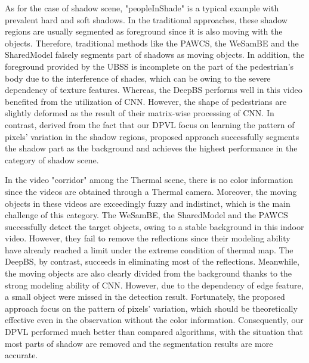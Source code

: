 \documentclass[journal]{IEEEtran}
\begin{document}
As for the case of shadow scene, "peopleInShade" is a typical example with prevalent hard and soft shadows. 
In the traditional approaches, these shadow regions are usually segmented as foreground since it is also moving with the objects. 
Therefore, traditional methods like the PAWCS, the WeSamBE and the SharedModel falsely segments part of shadows as moving objects. 
In addition, the foreground provided by the UBSS is incomplete on the part of the pedestrian's body due to the interference of shades, which can be owing to the severe dependency of texture features. 
Whereas, the DeepBS performs well in this video benefited from the utilization of CNN. 
However, the shape of pedestrians are slightly deformed as the result of their matrix-wise processing of CNN. 
In contrast, derived from the fact that our DPVL focus on learning the pattern of pixels' variation in the shadow regions, proposed approach successfully segments the shadow part as the background and achieves the highest performance in the category of shadow scene.

In the video "corridor" among the Thermal scene, there is no color information since the videos are obtained through a Thermal camera. 
Moreover, the moving objects in these videos are exceedingly fuzzy and indistinct, which is the main challenge of this category. 
The WeSamBE, the SharedModel and the PAWCS successfully detect the target objects, owing to a stable background in this indoor video. 
However, they fail to remove the reflections since their modeling ability have already reached a limit under the extreme condition of thermal map. 
The DeepBS, by contrast, succeeds in eliminating most of the reflections. 
Meanwhile, the moving objects are also clearly divided from the background thanks to the strong modeling ability of CNN. 
However, due to the dependency of edge feature, a small object were missed in the detection result. 
Fortunately, the proposed approach focus on the pattern of pixels' variation, which should be theoretically effective even in the observation without the color information. 
Consequently, our DPVL performed much better than compared algorithms, with the situation that most parts of shadow are removed and the segmentation results are more accurate.
\end{document}
